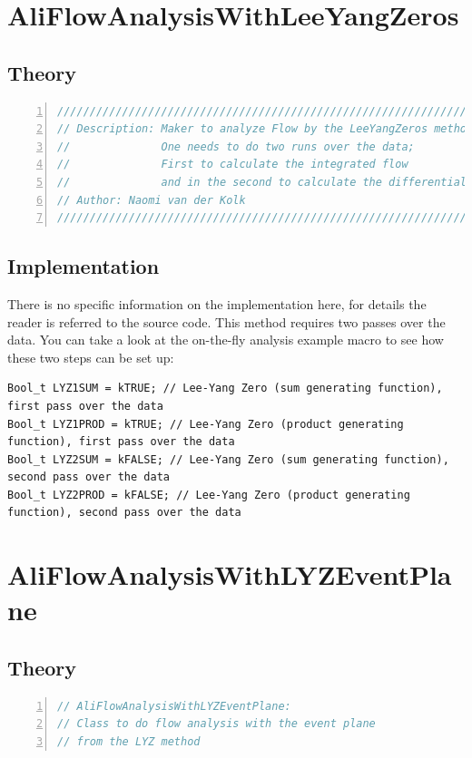 \documentclass[a4paper]{book}
\numberwithin{equation}{subsection}
\begin{document}
\section{AliFlowAnalysisWithLeeYangZeros}
\subsection{Theory}
\begin{lstlisting}[language=C, numbers=left]
////////////////////////////////////////////////////////////////////
// Description: Maker to analyze Flow by the LeeYangZeros method
//              One needs to do two runs over the data; 
//              First to calculate the integrated flow 
//              and in the second to calculate the differential flow
// Author: Naomi van der Kolk 
//////////////////////////////////////////////////////////////////// \end{lstlisting}
\subsection{Implementation}
There is no specific information on the implementation here, for details the reader is referred to the source code.
This method requires two passes over the data. You can take a look at the on-the-fly analysis example macro to see how these two steps can be set up:
\begin{lstlisting}
Bool_t LYZ1SUM = kTRUE; // Lee-Yang Zero (sum generating function), first pass over the data
Bool_t LYZ1PROD = kTRUE; // Lee-Yang Zero (product generating function), first pass over the data
Bool_t LYZ2SUM = kFALSE; // Lee-Yang Zero (sum generating function), second pass over the data
Bool_t LYZ2PROD = kFALSE; // Lee-Yang Zero (product generating function), second pass over the data\end{lstlisting}
\section{AliFlowAnalysisWithLYZEventPlane}
\subsection{Theory}
\begin{lstlisting}[language=C, numbers=left]
// AliFlowAnalysisWithLYZEventPlane:
// Class to do flow analysis with the event plane
// from the LYZ method
\end{lstlisting}
\end{document}
